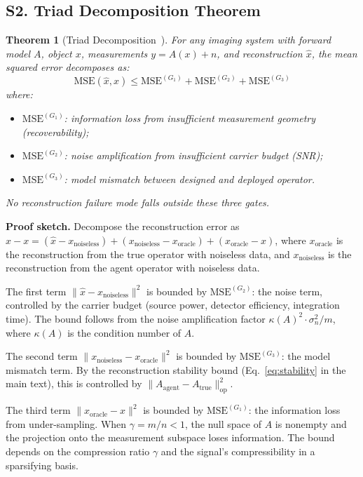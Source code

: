 \documentclass[11pt,a4paper]{article}
\newtheorem{theorem}{Theorem}
\begin{document}
\subsection*{S2. Triad Decomposition Theorem}

\begin{theorem}[Triad Decomposition~\cite{paperII}]
\label{thm:triad}
For any imaging system with forward model $A$, object $x$, measurements $y = A(x) + n$, and reconstruction $\hat{x}$, the mean squared error decomposes as:
\[
\text{MSE}(\hat{x}, x) \leq \text{MSE}^{(G_1)} + \text{MSE}^{(G_2)} + \text{MSE}^{(G_3)}
\]
where:
\begin{itemize}[nosep]
\item $\text{MSE}^{(G_1)}$: information loss from insufficient measurement geometry (recoverability);
\item $\text{MSE}^{(G_2)}$: noise amplification from insufficient carrier budget (SNR);
\item $\text{MSE}^{(G_3)}$: model mismatch between designed and deployed operator.
\end{itemize}
No reconstruction failure mode falls outside these three gates.
\end{theorem}

\textbf{Proof sketch.}
Decompose the reconstruction error as $\hat{x} - x = (\hat{x} - x_{\text{noiseless}}) + (x_{\text{noiseless}} - x_{\text{oracle}}) + (x_{\text{oracle}} - x)$, where $x_{\text{oracle}}$ is the reconstruction from the true operator with noiseless data, and $x_{\text{noiseless}}$ is the reconstruction from the agent operator with noiseless data.

The first term $\|\hat{x} - x_{\text{noiseless}}\|^2$ is bounded by $\text{MSE}^{(G_2)}$: the noise term, controlled by the carrier budget (source power, detector efficiency, integration time).  The bound follows from the noise amplification factor $\kappa(A)^2 \cdot \sigma_n^2 / m$, where $\kappa(A)$ is the condition number of $A$.

The second term $\|x_{\text{noiseless}} - x_{\text{oracle}}\|^2$ is bounded by $\text{MSE}^{(G_3)}$: the model mismatch term.  By the reconstruction stability bound (Eq.~\ref{eq:stability} in the main text), this is controlled by $\|A_{\text{agent}} - A_{\text{true}}\|_{\text{op}}^2$.

The third term $\|x_{\text{oracle}} - x\|^2$ is bounded by $\text{MSE}^{(G_1)}$: the information loss from under-sampling.  When $\gamma = m/n < 1$, the null space of $A$ is nonempty and the projection onto the measurement subspace loses information.  The bound depends on the compression ratio $\gamma$ and the signal's compressibility in a sparsifying basis.
\end{document}
